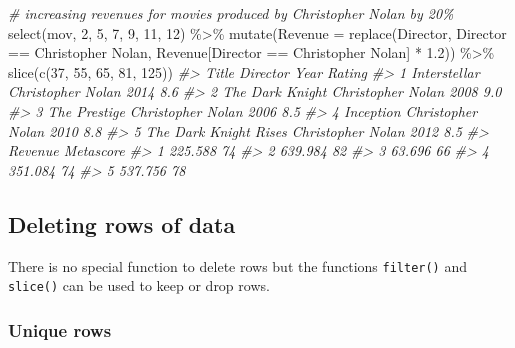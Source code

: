 \documentclass[
]{book}
\newenvironment{Shaded}{\begin{snugshade}}{\end{snugshade}}
\newcommand{\AttributeTok}[1]{\textcolor[rgb]{0.77,0.63,0.00}{#1}}
\newcommand{\CommentTok}[1]{\textcolor[rgb]{0.56,0.35,0.01}{\textit{#1}}}
\newcommand{\DecValTok}[1]{\textcolor[rgb]{0.00,0.00,0.81}{#1}}
\newcommand{\FloatTok}[1]{\textcolor[rgb]{0.00,0.00,0.81}{#1}}
\newcommand{\FunctionTok}[1]{\textcolor[rgb]{0.00,0.00,0.00}{#1}}
\newcommand{\NormalTok}[1]{#1}
\newcommand{\SpecialCharTok}[1]{\textcolor[rgb]{0.00,0.00,0.00}{#1}}
\newcommand{\StringTok}[1]{\textcolor[rgb]{0.31,0.60,0.02}{#1}}
\begin{document}
\begin{Shaded}
\begin{Highlighting}[]
\CommentTok{\# increasing revenues for movies produced by Christopher Nolan by 20\%}
\FunctionTok{select}\NormalTok{(mov, }\DecValTok{2}\NormalTok{, }\DecValTok{5}\NormalTok{, }\DecValTok{7}\NormalTok{, }\DecValTok{9}\NormalTok{, }\DecValTok{11}\NormalTok{, }\DecValTok{12}\NormalTok{) }\SpecialCharTok{\%\textgreater{}\%}
  \FunctionTok{mutate}\NormalTok{(}\AttributeTok{Revenue =} \FunctionTok{replace}\NormalTok{(Director, Director }\SpecialCharTok{==} \StringTok{\textquotesingle{}Christopher Nolan\textquotesingle{}}\NormalTok{, }
\NormalTok{                           Revenue[Director }\SpecialCharTok{==} \StringTok{\textquotesingle{}Christopher Nolan\textquotesingle{}}\NormalTok{] }\SpecialCharTok{*} \FloatTok{1.2}\NormalTok{)) }\SpecialCharTok{\%\textgreater{}\%}
  \FunctionTok{slice}\NormalTok{(}\FunctionTok{c}\NormalTok{(}\DecValTok{37}\NormalTok{, }\DecValTok{55}\NormalTok{, }\DecValTok{65}\NormalTok{, }\DecValTok{81}\NormalTok{, }\DecValTok{125}\NormalTok{))}
\CommentTok{\#\textgreater{}                   Title          Director Year Rating}
\CommentTok{\#\textgreater{} 1          Interstellar Christopher Nolan 2014    8.6}
\CommentTok{\#\textgreater{} 2       The Dark Knight Christopher Nolan 2008    9.0}
\CommentTok{\#\textgreater{} 3          The Prestige Christopher Nolan 2006    8.5}
\CommentTok{\#\textgreater{} 4             Inception Christopher Nolan 2010    8.8}
\CommentTok{\#\textgreater{} 5 The Dark Knight Rises Christopher Nolan 2012    8.5}
\CommentTok{\#\textgreater{}   Revenue Metascore}
\CommentTok{\#\textgreater{} 1 225.588        74}
\CommentTok{\#\textgreater{} 2 639.984        82}
\CommentTok{\#\textgreater{} 3  63.696        66}
\CommentTok{\#\textgreater{} 4 351.084        74}
\CommentTok{\#\textgreater{} 5 537.756        78}
\end{Highlighting}
\end{Shaded}

\hypertarget{deleting-rows-of-data}{%
\subsection{Deleting rows of data}\label{deleting-rows-of-data}}

There is no special function to delete rows but the functions \texttt{filter()} and \texttt{slice()} can be used to keep or drop rows.

\hypertarget{unique-rows}{%
\subsubsection{Unique rows}\label{unique-rows}}
\end{document}

